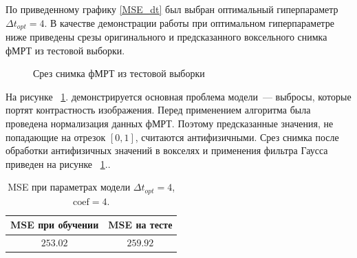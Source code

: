 \documentclass[12pt,twoside]{article}
\newcommand{\myfigref}[2]{~\ref{#1}.\subref{#2}}%
\begin{document}
По приведенному графику \ref{MSE_dt} был выбран оптимальный гиперпараметр ${\Delta t}_{opt} = 4$.
В качестве демонстрации работы при оптимальном гиперпараметре ниже приведены срезы оригинального и предсказанного воксельного снимка фМРТ из тестовой выборки.
\begin{figure}[h!]
    \centering
    \hfill
    \hfill
    \caption{Срез снимка фМРТ из тестовой выборки}
    \label{fig:3}
\end{figure}

На рисунке \myfigref{fig:3}{fig:3-pred} демонстрируется основная проблема модели~--- выбросы, которые портят контрастность изображения.
Перед применением алгоритма была проведена нормализация данных фМРТ.
Поэтому предсказанные значения, не попадающие на отрезок $[0,1]$, считаются антифизичными.
Срез снимка после обработки антифизичных значений в вокселях и применения фильтра Гаусса приведен на рисунке \myfigref{fig:3}{fig:3-pred-pg}.

\begin{table}[H]
    \caption{\label{tab:1} MSE при параметрах модели ${\Delta t}_{opt} = 4$, $\mathrm{coef} = 4$.}
    \begin{center}
    \begin{tabular}{|c|c|}
    \hline
    MSE при обучении & MSE на тесте \\
    \hline
    $253.02$ & $259.92$ \\
    \hline
    \end{tabular}
    \end{center}
\end{table} 
\end{document}
